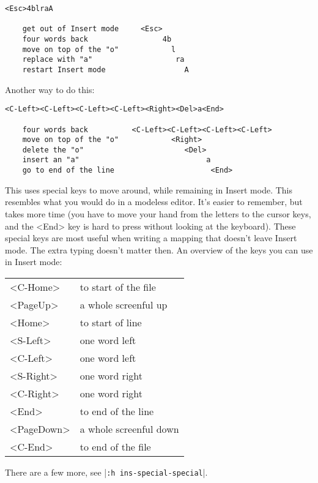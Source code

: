\begin{Verbatim}[samepage=true]
                               <Esc>4blraA

    get out of Insert mode     <Esc>
    four words back                 4b
    move on top of the "o"            l
    replace with "a"                   ra
    restart Insert mode                  A
\end{Verbatim}

Another way to do this:

\begin{Verbatim}[samepage=true]
     <C-Left><C-Left><C-Left><C-Left><Right><Del>a<End>

    four words back          <C-Left><C-Left><C-Left><C-Left>
    move on top of the "o"            <Right>
    delete the "o"                       <Del>
    insert an "a"                             a
    go to end of the line                      <End>
\end{Verbatim}

This uses special keys to move around, while remaining in Insert mode.
This resembles what you would do in a modeless editor.
It's easier to remember, but takes more time (you have to move your hand from the letters to the cursor keys, and the <End> key is hard to press without looking at the keyboard).
These special keys are most useful when writing a mapping that doesn't leave Insert mode.
The extra typing doesn't matter then.
An overview of the keys you can use in Insert mode:

\begin{center} \begin{tabular}{l l}
				<C-Home> & to start of the file \\
				<PageUp> & a whole screenful up \\
				<Home> & to start of line \\
				<S-Left> & one word left \\
				<C-Left> & one word left \\
				<S-Right> & one word right \\
				<C-Right> & one word right \\
				<End> & to end of the line \\
				<PageDown> & a whole screenful down \\
				<C-End> & to end of the file
\end{tabular} \end{center}

There are a few more, see |\texttt{:h ins-special-special}|.
